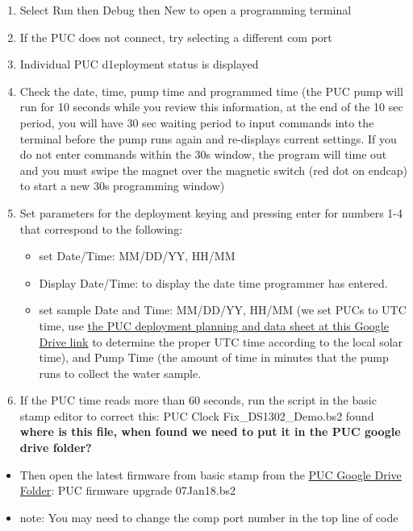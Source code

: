 \documentclass[]{book}
\providecommand{\tightlist}{%
  \setlength{\itemsep}{0pt}\setlength{\parskip}{0pt}}
\begin{document}
\begin{enumerate}
\def\labelenumi{\arabic{enumi}.}
\item
  Select Run then Debug then New to open a programming terminal
\item
  If the PUC does not connect, try selecting a different com port
\item
  Individual PUC d1eployment status is displayed
\item
  Check the date, time, pump time and programmed time (the PUC pump will run for 10 seconds while you review this information, at the end of the 10 sec period, you will have 30 sec waiting period to input commands into the terminal before the pump runs again and re-displays current settings. If you do not enter commands within the 30s window, the program will time out and you must swipe the magnet over the magnetic switch (red dot on endcap) to start a new 30s programming window)
\item
  Set parameters for the deployment keying and pressing enter for numbers 1-4 that correspond to the following:

  \begin{itemize}
  \tightlist
  \item
    set Date/Time: MM/DD/YY, HH/MM
  \item
    Display Date/Time: to display the date time programmer has entered.
  \item
    set sample Date and Time: MM/DD/YY, HH/MM (we set PUCs to UTC time, use \href{https://drive.google.com/drive/folders/1aprNsz_a0cfscmCBz0DjbCuvCFerOfaw}{the PUC deployment planning and data sheet at this Google Drive link} to determine the proper UTC time according to the local solar time), and Pump Time (the amount of time in minutes that the pump runs to collect the water sample.
  \end{itemize}
\item
  If the PUC time reads more than 60 seconds, run the script in the basic stamp editor to correct this: PUC Clock Fix\_DS1302\_Demo.bs2 found \textbf{where is this file, when found we need to put it in the PUC google drive folder?}
\end{enumerate}

\begin{itemize}
\tightlist
\item
  Then open the latest firmware from basic stamp from the \href{https://drive.google.com/drive/folders/1X6fAG4OIDs66Ji5xzYsX8JySqhkSs5k-}{PUC Google Drive Folder}: PUC firmware upgrade 07Jan18.bs2
\item
  note: You may need to change the comp port number in the top line of code
\end{itemize}
\end{document}
